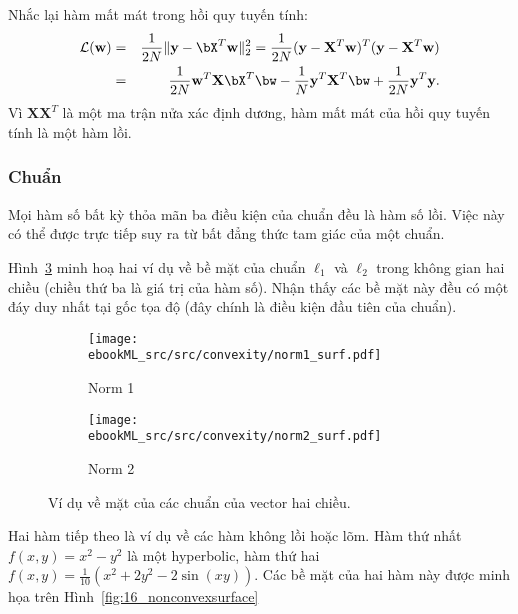 Nhắc lại hàm mất mát trong hồi quy tuyến tính:
\begin{eqnarray*} 
\mathcal{L}(\mathbf{w}) &=& \frac{1}{2N} \|\mathbf{y} -
\bX^T\mathbf{w}\|_2^2 = \frac{1}{2N} (\mathbf{y} -
\mathbf{X}^T\mathbf{w})^T(\mathbf{y} - \mathbf{X}^T\mathbf{w})  \\\ 
&=& \frac{1}{2N} \mathbf{w}^T\mathbf{X}\bX^T\bw -
\frac{1}{N}\mathbf{y}^T\mathbf{X}^T\bw + \frac{1}{2N}\mathbf{y}^T\mathbf{y}.
\end{eqnarray*} 
Vì $\mathbf{X}\mathbf{X}^T$ là một ma trận nửa xác định dương, hàm mất mát của
hồi quy tuyến tính là một hàm lồi.
 
 
\subsubsection{Chuẩn}
Mọi hàm số bất kỳ thỏa mãn ba điều kiện của chuẩn đều là hàm số lồi. Việc này có thể
được trực tiếp suy ra từ bất đẳng thức tam giác của một chuẩn. 


Hình~\ref{fig:16_norm_surf} minh hoạ hai ví dụ về bề mặt của chuẩn $\ell_1$ và
$\ell_2$
trong không gian hai chiều (chiều thứ ba là giá trị của hàm
số). Nhận thấy các bề mặt này đều có {một đáy duy nhất} tại gốc tọa độ (đây chính là điều kiện đầu tiên của chuẩn). 


\begin{figure}[t]
    \begin{subfigure}{0.48\textwidth}
    \texttt{[image: ebookML\_src/src/convexity/norm1\_surf.pdf]}
    \caption{Norm 1}
    \label{fig:subim1}
    \end{subfigure}
    \begin{subfigure}{0.48\textwidth}
    \texttt{[image: ebookML\_src/src/convexity/norm2\_surf.pdf]}
    \caption{Norm 2}
    \label{fig:subim2}
    \end{subfigure}
    \caption{Ví dụ về mặt của các chuẩn của vector hai chiều.}
    \label{fig:16_norm_surf}
\end{figure}
Hai hàm tiếp theo là ví dụ về các hàm không lồi hoặc lõm. Hàm
thứ nhất $f(x, y) = x^2 - y^2$ là một hyperbolic, hàm thứ hai $f(x,y) =
\frac{1}{10}(x^2 + 2y^2 - 2\sin(xy)) $. Các bề mặt của hai hàm này được minh
họa trên Hình~\ref{fig:16_nonconvexsurface}
 
